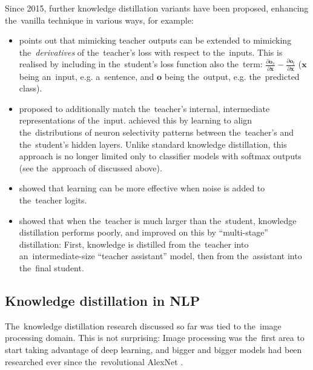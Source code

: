 \documentclass[bsc,frontabs,singlespacing,parskip,deptreport]{infthesis}
\begin{document}
{{{      Since 2015, further knowledge distillation variants have been proposed, enhancing the~vanilla technique in various ways, for example:
      \begin{itemize}
        \item \citet[p. 13]{Papamakarios_2015} points out that mimicking teacher outputs can be extended to mimicking the~\textit{derivatives} of the~teacher's loss with respect to the~inputs. This is realised by including in the~student's loss function also the~term: $\frac{\partial \bm{o}_s}{\partial \bm{x}} - \frac{\partial \bm{o}_t}{\partial \bm{x}}$ ($\bm{x}$ being an~input, e.g. a~sentence, and $\bm{o}$ being the~output, e.g. the~predicted class). %
        \item \citet{Romero_2015} proposed to additionally match the~teacher's internal, intermediate representations of the~input. \citet{Huang_2017} achieved this by learning to align the~distributions of neuron selectivity patterns between the~teacher's and the~student's hidden layers. Unlike standard knowledge distillation, this approach is no longer limited only to classifier models with softmax outputs (see the~approach of \citet{Hinton_2015} discussed above).
        \item \citet{Sau_2016} showed that learning can be more effective when noise is added to the~teacher logits.
        \item \citet{Mirzadeh_2019} showed that when the~teacher is much larger than the~student, knowledge distillation performs poorly, and improved on this by ``multi-stage'' distillation: First, knowledge is distilled from the~teacher into an~intermediate-size ``teacher assistant'' model, then from the~assistant into the~final student.
      \end{itemize}
    }

    \subsection{Knowledge distillation in NLP}{
      \label{sec:kd-nlp}
      The~knowledge distillation research discussed so far was tied to the~image processing domain. This is not surprising: Image processing was the~first area to start taking advantage of deep learning, and bigger and bigger models had been researched ever since the~revolutional AlexNet \citep{Krizhevsky_2012}.

}}}
\end{document}
